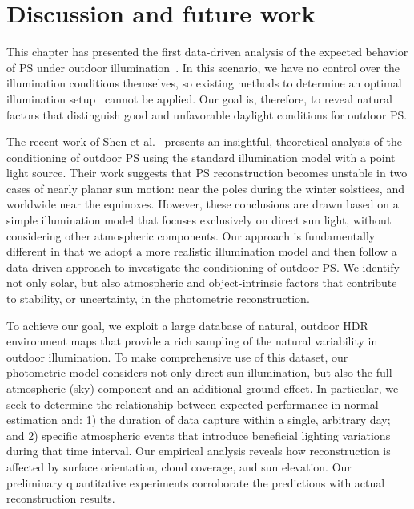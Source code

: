 \section{Discussion and future work}
\label{sec:3dv-discussion}
\label{sec:iccp-discussion}

This chapter has presented the first data-driven analysis of the expected behavior of PS under outdoor illumination~\cite{Hold-Geoffroy-ICCP15,Hold-Geoffroy-3DV15}. In this scenario, we have no control over the illumination conditions themselves, so existing methods to determine an optimal illumination setup~\cite{drbohlav-iccv-05,klaudiny-prl-14} cannot be applied. Our goal is, therefore, to reveal natural factors that distinguish good and unfavorable daylight conditions for outdoor PS.

The recent work of Shen et al.~\cite{shen-pg-14} presents an insightful, theoretical analysis of the conditioning of outdoor PS using the standard illumination model with a point light source. Their work suggests that PS reconstruction becomes unstable in two cases of nearly planar sun motion: near the poles during the winter solstices, and worldwide near the equinoxes. However, these conclusions are drawn based on a simple illumination model that focuses exclusively on direct sun light, without considering other atmospheric components. Our approach is fundamentally different in that we adopt a more realistic illumination model and then follow a data-driven approach to investigate the conditioning of outdoor PS. We identify not only solar, but also atmospheric and object-intrinsic factors that contribute to stability, or uncertainty, in the photometric reconstruction.


To achieve our goal, we exploit a large database of natural, outdoor HDR environment maps that provide a rich sampling of the natural variability in outdoor illumination. To make comprehensive use of this dataset, our photometric model considers not only direct sun illumination, but also the full atmospheric (sky) component and an additional ground effect. In particular, we seek to determine the relationship between expected performance in normal estimation and: 1) the duration of data capture within a single, arbitrary day; and 2) specific atmospheric events that introduce beneficial lighting variations during that time interval. Our empirical analysis reveals how reconstruction is affected by surface orientation, cloud coverage, and sun elevation. Our preliminary quantitative experiments corroborate the predictions with actual reconstruction results.

